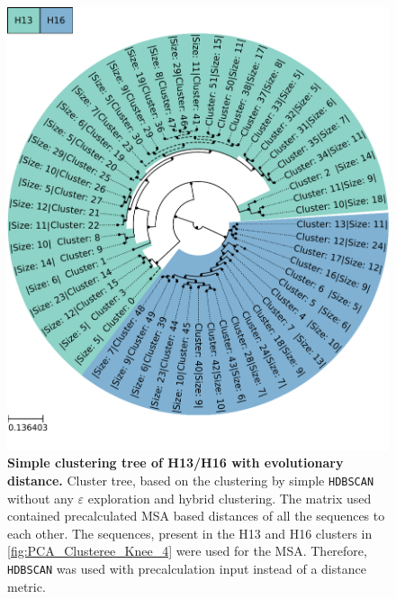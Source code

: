 \begin{figure}[!hbt]
    \centering
    \includegraphics[width=\textwidth]{PCA/Clustertree_Segment_4_H_Focus.pdf}
    \caption[Simple clustering tree of H13/H16 with evolutionary distance]{\textbf{Simple clustering tree of H13/H16 with evolutionary distance.} Cluster tree, based on the clustering by simple \texttt{HDBSCAN} without any $\varepsilon$ exploration and hybrid clustering. The matrix used contained precalculated \gls{MSA} based distances of all the sequences to each other. The sequences, present in the H13 and H16 clusters in \autoref{fig:PCA_Clusteree_Knee_4} were used for the \gls{MSA}. Therefore, \texttt{HDBSCAN} was used with precalculation input instead of a distance metric.}
    \label{fig:Simple_Clustertree_MSA}
\end{figure}


